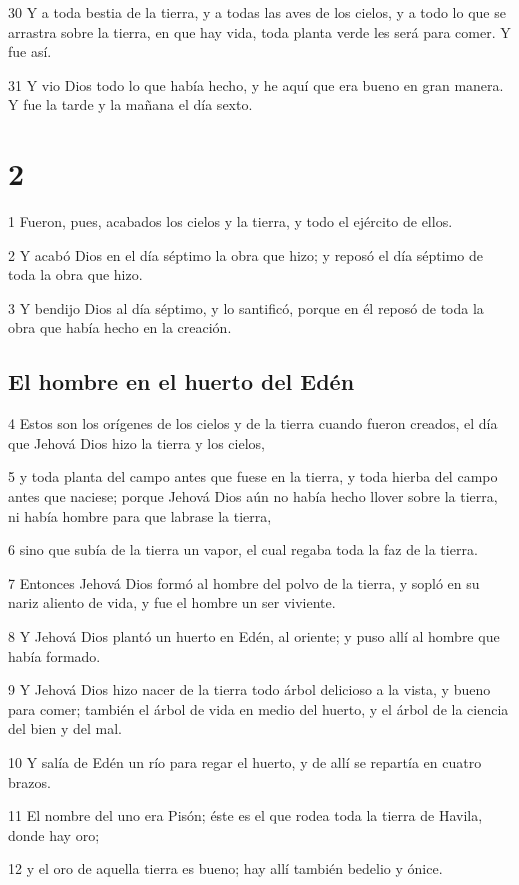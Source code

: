 30 Y a toda bestia de la tierra, y a todas las aves de los cielos, y a todo lo que se arrastra sobre la tierra, en que hay vida, toda planta verde les será para comer. Y fue así.

31 Y vio Dios todo lo que había hecho, y he aquí que era bueno en gran manera. Y fue la tarde y la mañana el día sexto.

\chapter{2}

1 Fueron, pues, acabados los cielos y la tierra, y todo el ejército de ellos.

2 Y acabó Dios en el día séptimo la obra que hizo; y reposó el día séptimo de toda la obra que hizo.

3 Y bendijo Dios al día séptimo, y lo santificó, porque en él reposó de toda la obra que había hecho en la creación.

\section{El hombre en el huerto del Edén}

4 Estos son los orígenes de los cielos y de la tierra cuando fueron creados, el día que Jehová Dios hizo la tierra y los cielos,

5 y toda planta del campo antes que fuese en la tierra, y toda hierba del campo antes que naciese; porque Jehová Dios aún no había hecho llover sobre la tierra, ni había hombre para que labrase la tierra,

6 sino que subía de la tierra un vapor, el cual regaba toda la faz de la tierra.

7 Entonces Jehová Dios formó al hombre del polvo de la tierra, y sopló en su nariz aliento de vida, y fue el hombre un ser viviente.

8 Y Jehová Dios plantó un huerto en Edén, al oriente; y puso allí al hombre que había formado.

9 Y Jehová Dios hizo nacer de la tierra todo árbol delicioso a la vista, y bueno para comer; también el árbol de vida en medio del huerto, y el árbol de la ciencia del bien y del mal.

10 Y salía de Edén un río para regar el huerto, y de allí se repartía en cuatro brazos.

11 El nombre del uno era Pisón; éste es el que rodea toda la tierra de Havila, donde hay oro;

12 y el oro de aquella tierra es bueno; hay allí también bedelio y ónice.


